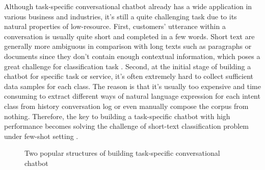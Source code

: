 \documentclass[letterpaper]{article} %
\begin{document}
  Although  task-specific  conversational chatbot already has a wide application
  in various business and industries, it's still a quite challenging task due to
  its  natural  properties of low-resource. First, customers' utterance within a
  conversation  is  usually  quite  short  and  completed  in a few words. Short
  text \cite{song2014short}  are generally more ambiguous in comparison with long
  texts  such  as  paragraphs  or  documents  since  they  don't  contain enough
  contextual  information,  which poses a great challenge \cite{chen2019deep} for
  classification        task \cite{phan2008learning,yan2009dynamic,hua2015short}.
  Second,  at  the  initial  stage  of  building  a chatbot for specific task or
  service, it's often extremely hard to collect sufficient data samples for each
  class.  The  reason  is  that it's usually too expensive and time consuming to
  extract  different  ways  of natural language expression for each intent class
  from  history  conversation  log  or  even  manually  compose  the corpus from
  nothing.  Therefore,  the  key  to  building a task-specific chatbot with high
  performance     becomes     solving     the     challenge     of    short-text
  classification \cite{sriram2010short}        problem       under       few-shot
  setting \cite{yu2018diverse}.

  \begin{figure}[htbp]
    \centering 
    \caption{Two popular structures of building task-specific conversational chatbot}
    \label{Fig.1.main}
  \end{figure}
\end{document}
